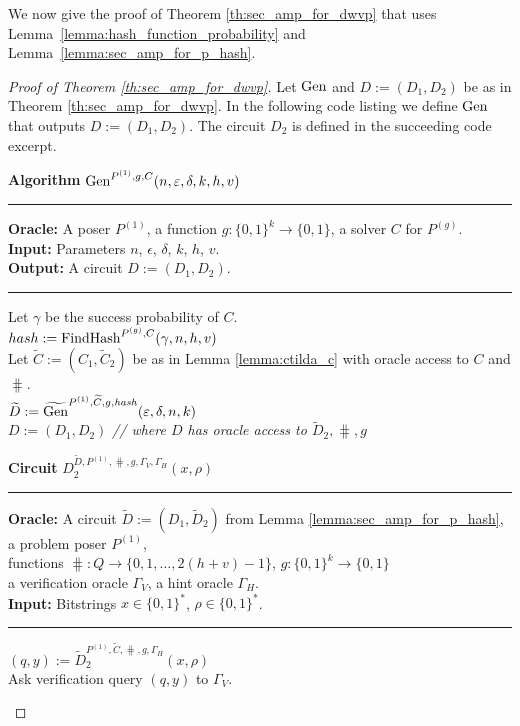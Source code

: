 %
We now give the proof of Theorem \ref{th:sec_amp_for_dwvp} that uses Lemma~\ref{lemma:hash_function_probability} and Lemma~\ref{lemma:sec_amp_for_p_hash}.
%
\begin{proof}[Proof of Theorem \ref{th:sec_amp_for_dwvp}]
  Let $\operatorname{\text{Gen}}$ and $D := (D_1, D_2)$ be as in Theorem \ref{th:sec_amp_for_dwvp}.
  In the following code listing we define $\operatorname{\text{Gen}}$ that outputs $D := (D_1, D_2)$.
  The circuit $D_2$ is defined in the succeeding code excerpt.
%
\begin{codeblock}
  \textbf{Algorithm} $\operatorname{\text{Gen}}^{P^{(1)}, g, C}(n, \varepsilon, \delta, k, h, v)$
  \medskip\hrule
  \textbf{Oracle:} A poser $P^{(1)}$, a function $g: \{0,1\}^{k} \rightarrow \{0,1\}$, a solver $C$ for $P^{(g)}$.  \\
  \textbf{Input:} Parameters $n$, $\epsilon$, $\delta$, $k$, $h$, $v$.\\
  \textbf{Output:} A circuit $D := (D_1, D_2)$.
  \medskip\hrule
  Let $\gamma$ be the success probability of $C$.\\
  $hash := \operatorname{\text{FindHash}}^{P^{(g)}, C}(\gamma, n, h, v)$ \\
  Let $\widetilde{C} := (C_1, \widetilde{C}_2)$ be as in Lemma \ref{lemma:ctilda_c} with oracle access to $C$ and $\hash$. \\
  $\widetilde{D} := \widetilde{\operatorname{\text{Gen}}}^{P^{(1)},  \widetilde{C},  g, \operatorname{\mathit{hash}}}(\varepsilon, \delta, n, k)$ \\
  \Return $D := (D_1, D_2)$ \textit{// where $D$ has oracle access to $\widetilde{D}_2, \hash, g$}
\end{codeblock}
%
\begin{codeblock}
  \textbf{Circuit} $D_2^{\widetilde{D}, P^{(1)}, \hash, g, \Gamma_V, \Gamma_H}(x, \rho)$
  \medskip \hrule
  \textbf{Oracle:} A circuit $\widetilde{D} :=(D_1, \widetilde{D}_2)$ from Lemma \ref{lemma:sec_amp_for_p_hash}, a problem poser $P^{(1)}$, \\
  \IndII functions $\hash: Q \rightarrow \{0,1, \dots, 2(h+v) - 1\}$, $g: \{0,1\}^{k} \rightarrow \{0,1\}$ \\
  \IndII a verification oracle $\Gamma_V$, a hint oracle $\Gamma_H$.\\
  \textbf{Input:}  Bitstrings $x \in \{0,1\}^{*}$, $\rho \in \{0,1\}^{*}$.
  \medskip\hrule
  $(q, y) := \widetilde{D}_2^{P^{(1)}, \widetilde{C}, \hash, g, \Gamma_H}(x, \rho)$ \\
  Ask verification query $(q,y)$ to $\Gamma_V$.
\end{codeblock}

\end{proof}
